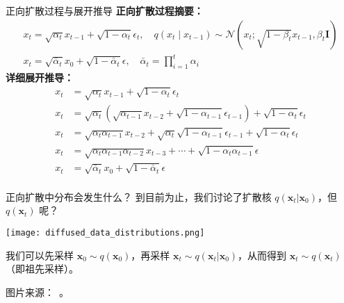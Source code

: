 \begin{frame}{正向扩散过程与展开推导}
  \textbf{正向扩散过程摘要：}
  \begin{align*}
      x_t = \sqrt{\alpha_t} x_{t-1} + \sqrt{1 - \alpha_t} \epsilon_t, \quad q(x_t \mid x_{t-1}) \sim \mathcal{N}\left(x_t; \sqrt{1 - \beta_t} x_{t-1}, \beta_t \mathbf{I} \right) \\
      x_t = \sqrt{\bar{\alpha}_t} x_0 + \sqrt{1 - \bar{\alpha}_t} \epsilon, \quad \bar{\alpha}_t = \prod_{i=1}^{t} \alpha_i
  \end{align*}
  \vspace{1em}
  \textbf{详细展开推导：}
  \begin{align*}
      x_t &= \sqrt{\alpha_t} x_{t-1} + \sqrt{1 - \alpha_t} \epsilon_t \\
      x_t &= \sqrt{\alpha_t} \left( \sqrt{\alpha_{t-1}} x_{t-2} + \sqrt{1 - \alpha_{t-1}} \epsilon_{t-1} \right) + \sqrt{1 - \alpha_t} \epsilon_t \\
      x_t &= \sqrt{\alpha_t \alpha_{t-1}} x_{t-2} + \sqrt{\alpha_t} \sqrt{1 - \alpha_{t-1}} \epsilon_{t-1} + \sqrt{1 - \alpha_t} \epsilon_t \\
      x_t &= \sqrt{\alpha_t \alpha_{t-1} \alpha_{t-2}} x_{t-3} + \cdots + \sqrt{1 - \alpha_t \alpha_{t-1}} \epsilon \\
      x_t &= \sqrt{\bar{\alpha}_t} x_0 + \sqrt{1 - \bar{\alpha}_t} \epsilon \\
  \end{align*}
\end{frame}
  
\begin{refsection}
  \begin{frame}{正向扩散中分布会发生什么？}
      到目前为止，我们讨论了扩散核 $q(\mathbf{x}_t|\mathbf{x}_0)$，但 $q(\mathbf{x}_t)$ 呢？

      \vspace{1em}

        \centering
        \texttt{[image: diffused\_data\_distributions.png]}

  
      我们可以先采样 $\mathbf{x}_0 \sim q(\mathbf{x}_0)$，再采样 $\mathbf{x}_t \sim q(\mathbf{x}_t|\mathbf{x}_0)$，从而得到 $\mathbf{x}_t \sim q(\mathbf{x}_t)$（即祖先采样）。
     
      \scriptsize 图片来源：~\cite{CVPR2023Tutorial}。
      \bottomleftrefs
  \end{frame}
  \end{refsection}



